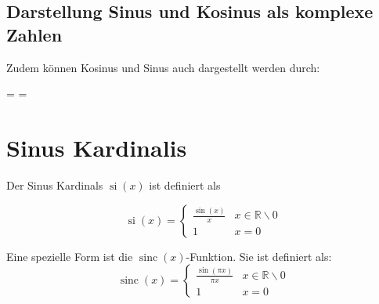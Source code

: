 \documentclass[12pt, a4paper]{scrreprt}
\newcommand{\im}{\textcolor{red}{i}}
\begin{document}
\subsection{Darstellung Sinus und Kosinus als komplexe Zahlen}

Zudem können Kosinus und Sinus auch dargestellt werden durch:

\begin{mathframed}
  \cos \varphi = \frac{e^{\im \varphi} + e^{- \im \varphi}}{2} \qquad
  \sin \varphi = \frac{e^{\im \varphi} - e^{- \im \varphi}}{2 \im}
\end{mathframed}

\section{Sinus Kardinalis}

\begin{minipage}{.5\linewidth}
Der Sinus Kardinals \(\operatorname{si}(x)\) ist definiert als

\[
  \operatorname{si}(x)=
  \begin{cases}
    \frac{\sin(x)}{x} & x \in \mathbb{R} \backslash 0\\
    1 & x = 0
  \end{cases}
\]
\end{minipage}%
\begin{minipage}{.5\linewidth}
  \begin{center}
  \end{center}
\end{minipage}

\begin{minipage}{.5\linewidth}
  Eine spezielle Form ist die \(\operatorname{sinc}(x)\)-Funktion. Sie ist definiert als:
  \[
    \operatorname{sinc}(x)=
    \begin{cases}
      \frac{\sin(\pi x)}{\pi x} & x \in\mathbb{R} \backslash 0\\
      1 & x = 0
    \end{cases}
  \]
\end{minipage}%
\begin{minipage}{.5\linewidth}
  \begin{center}
  \end{center}
\end{minipage}
\end{document}
